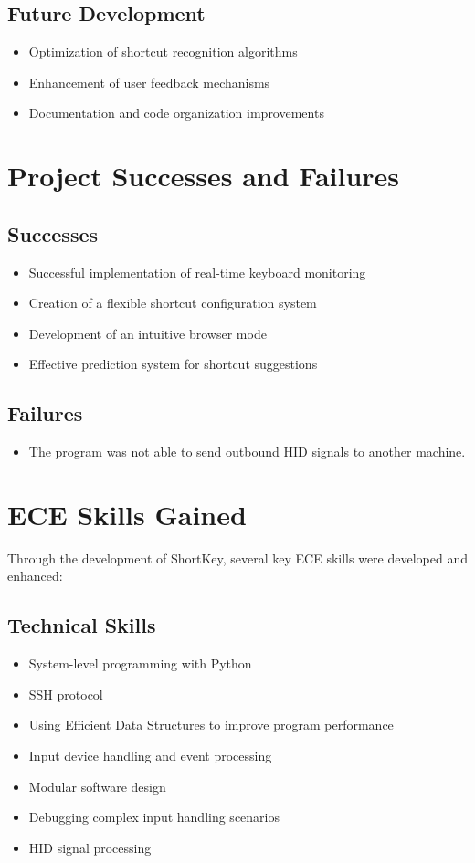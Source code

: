 \documentclass{article}
\begin{document}
\subsection{Future Development}
\begin{itemize}
    \item Optimization of shortcut recognition algorithms
    \item Enhancement of user feedback mechanisms
    \item Documentation and code organization improvements
\end{itemize}

\section{Project Successes and Failures}

\subsection{Successes}
\begin{itemize}
    \item Successful implementation of real-time keyboard monitoring
    \item Creation of a flexible shortcut configuration system
    \item Development of an intuitive browser mode
    \item Effective prediction system for shortcut suggestions
\end{itemize}

\subsection{Failures}
\begin{itemize}
    \item The program was not able to send outbound HID signals to another machine.
\end{itemize}

\section{ECE Skills Gained}
Through the development of ShortKey, several key ECE skills were developed and enhanced:

\subsection{Technical Skills}
\begin{itemize}
    \item System-level programming with Python
    \item SSH protocol
    \item Using Efficient Data Structures to improve program performance
    \item Input device handling and event processing
    \item Modular software design
    \item Debugging complex input handling scenarios
    \item HID signal processing
\end{itemize}
\end{document}
